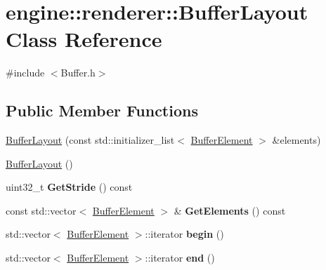 \hypertarget{classengine_1_1renderer_1_1BufferLayout}{}\section{engine\+:\+:renderer\+:\+:Buffer\+Layout Class Reference}
\label{classengine_1_1renderer_1_1BufferLayout}


{\ttfamily \#include $<$Buffer.\+h$>$}

\subsection*{Public Member Functions}
\begin{DoxyCompactItemize}
\item 
\hyperlink{classengine_1_1renderer_1_1BufferLayout_aad7d69ca7a55c528fd619bc2f51635f0}{Buffer\+Layout} (const std\+::initializer\+\_\+list$<$ \hyperlink{structengine_1_1renderer_1_1BufferElement}{Buffer\+Element} $>$ \&elements)
\item 
\hyperlink{classengine_1_1renderer_1_1BufferLayout_ae2a3753096d6a8171179d6e9c86facb8}{Buffer\+Layout} ()
\item 
\mbox{\label{classengine_1_1renderer_1_1BufferLayout_abf641c0a93611af20c756b881518d4c9}} 
uint32\+\_\+t {\bfseries Get\+Stride} () const
\item 
\mbox{\label{classengine_1_1renderer_1_1BufferLayout_aed5ee70b0eeef0dd0695f98e2e08a979}} 
const std\+::vector$<$ \hyperlink{structengine_1_1renderer_1_1BufferElement}{Buffer\+Element} $>$ \& {\bfseries Get\+Elements} () const
\item 
\mbox{\label{classengine_1_1renderer_1_1BufferLayout_a8256cfd10160a6fe261a21a81a9a588d}} 
std\+::vector$<$ \hyperlink{structengine_1_1renderer_1_1BufferElement}{Buffer\+Element} $>$\+::iterator {\bfseries begin} ()
\item 
\mbox{\label{classengine_1_1renderer_1_1BufferLayout_a10e0aeab4adbb50e425d84bfd3b753a2}} 
std\+::vector$<$ \hyperlink{structengine_1_1renderer_1_1BufferElement}{Buffer\+Element} $>$\+::iterator {\bfseries end} ()
\end{DoxyCompactItemize}


